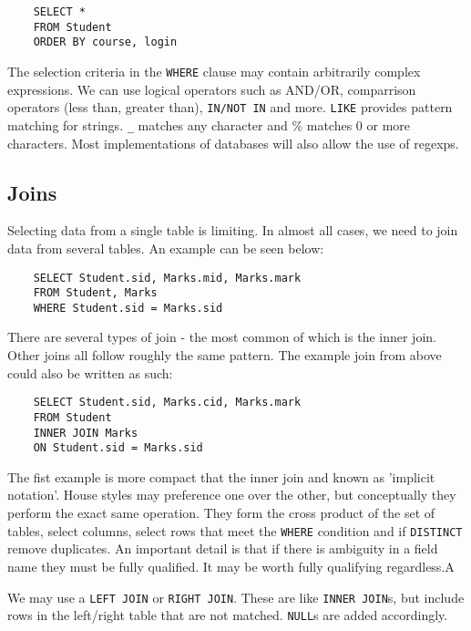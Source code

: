 \documentclass{article}
\begin{document}
	\begin{verbatim}
	SELECT *
	FROM Student
	ORDER BY course, login
	\end{verbatim}
	
	The selection criteria in the \texttt{WHERE} clause may contain arbitrarily complex expressions. We can use logical operators such as AND/OR, comparrison operators (less than, greater than), \texttt{IN/NOT IN} and more. \texttt{LIKE} provides pattern matching for strings. \texttt{\_} matches any character and \% matches 0 or more characters. Most implementations of databases will also allow the use of regexps.
	
	\subsection{Joins}
	Selecting data from a single table is limiting. In almost all cases, we need to join data from several tables. An example can be seen below:
	
	\begin{verbatim}
	SELECT Student.sid, Marks.mid, Marks.mark
	FROM Student, Marks
	WHERE Student.sid = Marks.sid
	\end{verbatim}
	
	There are several types of join - the most common of which is the inner join. Other joins all follow roughly the same pattern. The example join from above could also be written as such:
	
	\begin{verbatim}
	SELECT Student.sid, Marks.cid, Marks.mark
	FROM Student
	INNER JOIN Marks
	ON Student.sid = Marks.sid
	\end{verbatim}
	
	The fist example is more compact that the inner join and known as 'implicit notation'. House styles may preference one over the other, but conceptually they perform the exact same operation. They form the cross product of the set of tables, select columns, select rows that meet the \texttt{WHERE}
	 condition and if \texttt{DISTINCT} remove duplicates. An important detail is that if there is ambiguity in a field name they must be fully qualified. It may be worth fully qualifying regardless.A
	
	\par We may use a \texttt{LEFT JOIN} or \texttt{RIGHT JOIN}. These are like \texttt{INNER JOIN}s, but include rows in the left/right table that are not matched. \texttt{NULL}s are added accordingly. 
	
\end{document}
